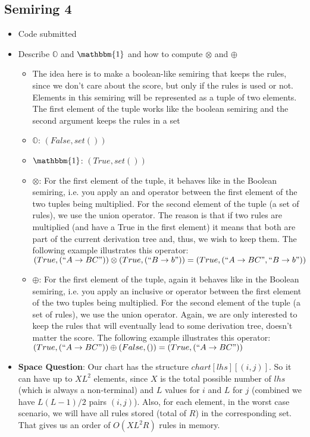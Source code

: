 \documentclass{article}
\begin{document}
\begin{spacing}{1.1}
\subsection{Semiring 4}
\begin{itemize}
	\item Code submitted
	\item Describe $\mathbb{O}$ and $\mathbbm{1}$ and how to compute $\otimes$ and $\oplus$
	\begin{itemize}
		\item The idea here is to make a boolean-like semiring that keeps the rules, since we don't care about the score, but only if the rules is used or not. Elements in this semiring will be represented as a tuple of two elements. The first element of the tuple works like the boolean semiring and the second argument keeps the rules in a set
		\item $\mathbb{O}$: $(False,set())$
		\item $\mathbbm{1}$:  $(True,set())$
		\item $\otimes$: For the first element of the tuple, it behaves like in the Boolean semiring, i.e. you apply an and operator between the first element of the two tuples being multiplied. For the second element of the tuple (a set of rules), we use the union operator. The reason is that if two rules are multiplied (and have a True in the first element) it means that both are part of the current derivation tree and, thus, we wish to keep them. The following example illustrates this operator: $(True,(``A\rightarrow B C"))\otimes(True, (``B\rightarrow b")) = (True, (``A\rightarrow B C", ``B\rightarrow b"))$
		\item $\oplus$: For the first element of the tuple, again it behaves like in the Boolean semiring, i.e. you apply an inclusive or operator between the first element of the two tuples being multiplied. For the second element of the tuple (a set of rules), we use the union operator. Again, we are only interested to keep the rules that will eventually lead to some derivation tree, doesn't matter the score. The following example illustrates this operator: $(True,(``A\rightarrow B C"))\oplus(False, ()) = (True,(``A\rightarrow B C"))$
	\end{itemize}
	\item {\bf Space Question}: Our chart has the structure $chart[lhs][(i,j)]$. So it can have up to $XL^2$ elements, since $X$ is the total possible number of $lhs$ (which is always a non-terminal) and $L$ values for $i$ and $L$ for $j$ (combined we have $L(L-1)/2$ pairs $(i,j)$). Also, for each element, in the worst case scenario, we will have all rules stored (total of $R$) in the corresponding set. That gives us an order of $O(XL^2R)$ rules in memory. 
\end{itemize}


\end{spacing}
\end{document}
